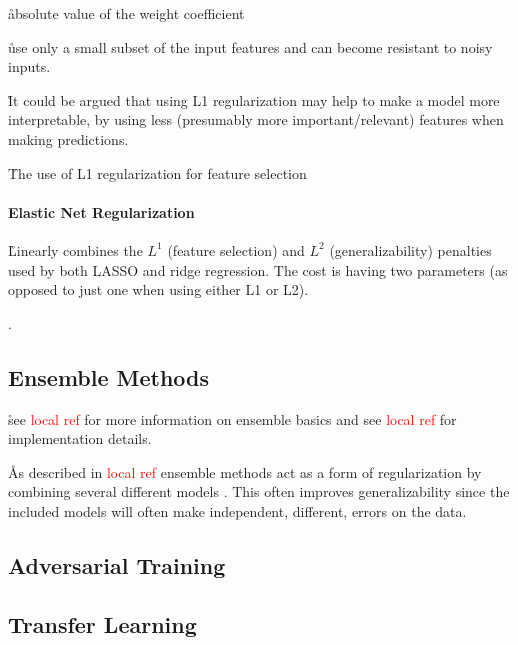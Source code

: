 \r{absolute value of the weight coefficient}

\r{use only a small subset of the input features and can become resistant to noisy inputs.}

\r{It could be argued that using L1 regularization may help to make a model more interpretable, by using less (presumably more important/relevant) features when making predictions.}

\r{The use of L1 regularization for feature selection}


\paragraph{Elastic Net Regularization}

\r{Linearly combines the $L^1$ (feature selection) and $L^2$ (generalizability) penalties used by both LASSO and ridge regression. The cost is having two parameters (as opposed to just one when using either L1 or L2).}

.



\subsection{Ensemble Methods}

\r{see \textcolor{red}{local ref} for more information on ensemble basics and see \textcolor{red}{local ref} for implementation details.}

\r{As described in \textcolor{red}{local ref} ensemble methods act as a form of regularization by combining several different models . This often improves generalizability since the included models will often make independent, different, errors on the data.}

\subsection{Adversarial Training}



\subsection{Transfer Learning}



